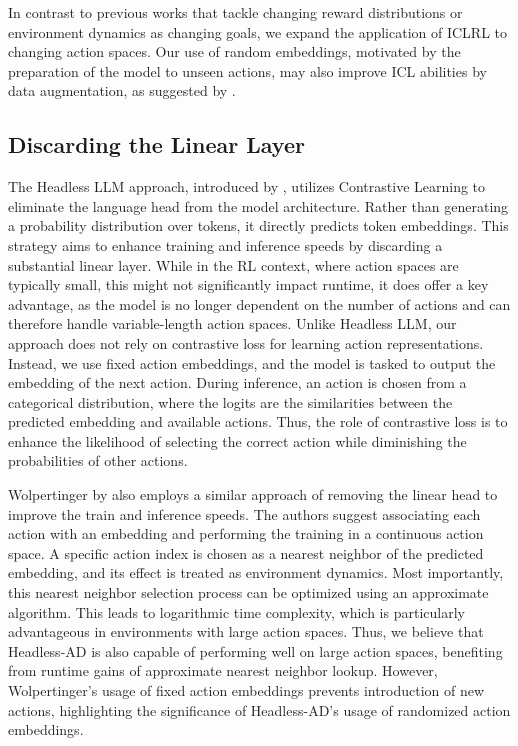 In contrast to previous works that tackle changing reward distributions or environment dynamics as changing goals, we expand the application of ICLRL to changing action spaces. Our use of random embeddings, motivated by the preparation of the model to unseen actions, may also improve ICL abilities by data augmentation, as suggested by \citet{kirsch2023towards}. 

\subsection{Discarding the Linear Layer}
The Headless LLM approach, introduced by \citet{godey2023headless}, utilizes Contrastive Learning to eliminate the language head from the model architecture. Rather than generating a probability distribution over tokens, it directly predicts token embeddings. This strategy aims to enhance training and inference speeds by discarding a substantial linear layer. While in the RL context, where action spaces are typically small, this might not significantly impact runtime, it does offer a key advantage, as the model is no longer dependent on the number of actions and can therefore handle variable-length action spaces. Unlike Headless LLM, our approach does not rely on contrastive loss for learning action representations. Instead, we use fixed action embeddings, and the model is tasked to output the embedding of the next action. During inference, an action is chosen from a categorical distribution, where the logits are the similarities between the predicted embedding and available actions. Thus, the role of contrastive loss is to enhance the likelihood of selecting the correct action while diminishing the probabilities of other actions. 

Wolpertinger by \citet{dulac2015deep} also employs a similar approach of removing the linear head to improve the train and inference speeds. The authors suggest associating each action with an embedding and performing the training in a continuous action space. A specific action index is chosen as a nearest neighbor of the predicted embedding, and its effect is treated as environment dynamics. 
Most importantly, this nearest neighbor selection process can be optimized using an approximate algorithm. This leads to logarithmic time complexity, which is particularly advantageous in environments with large action spaces. Thus, we believe that Headless-AD is also capable of performing well on large action spaces, benefiting from runtime gains of approximate nearest neighbor lookup. However, Wolpertinger's usage of fixed action embeddings prevents introduction of new actions, highlighting the significance of Headless-AD's usage of randomized action embeddings.